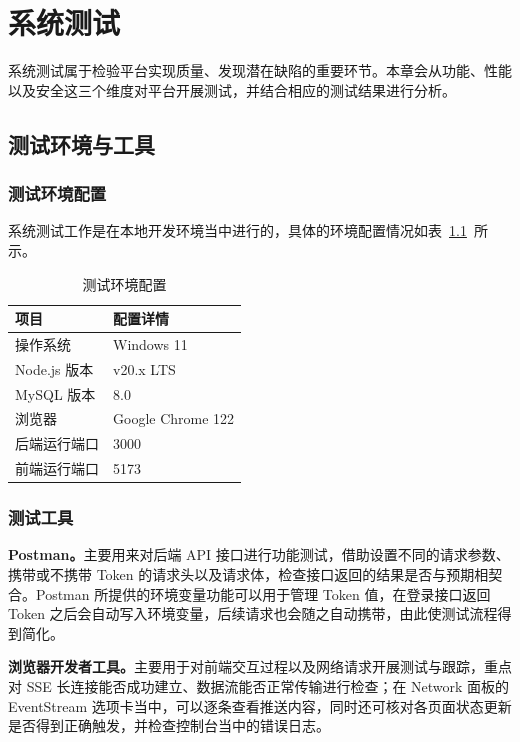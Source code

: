 \chapter{系统测试}

系统测试属于检验平台实现质量、发现潜在缺陷的重要环节。本章会从功能、性能以及安全这三个维度对平台开展测试，并结合相应的测试结果进行分析。

\section{测试环境与工具}

\subsection{测试环境配置}

系统测试工作是在本地开发环境当中进行的，具体的环境配置情况如表~\ref{tab:5-1}~所示。

\begin{table}[H]
    \centering
    \caption{测试环境配置}
    \label{tab:5-1}
    \begin{tabularx}{\linewidth}{lX}
        \toprule
        项目 & 配置详情 \\
        \midrule
        操作系统 & Windows 11 \\
        Node.js 版本 & v20.x LTS \\
        MySQL 版本 & 8.0 \\
        浏览器 & Google Chrome 122 \\
        后端运行端口 & 3000 \\
        前端运行端口 & 5173 \\
        \bottomrule
    \end{tabularx}
\end{table}

\subsection{测试工具}

\textbf{Postman。}主要用来对后端 API 接口进行功能测试，借助设置不同的请求参数、携带或不携带 Token 的请求头以及请求体，检查接口返回的结果是否与预期相契合。Postman 所提供的环境变量功能可以用于管理 Token 值，在登录接口返回 Token 之后会自动写入环境变量，后续请求也会随之自动携带，由此使测试流程得到简化。

\textbf{浏览器开发者工具。}主要用于对前端交互过程以及网络请求开展测试与跟踪，重点对 SSE 长连接能否成功建立、数据流能否正常传输进行检查；在 Network 面板的 EventStream 选项卡当中，可以逐条查看推送内容，同时还可核对各页面状态更新是否得到正确触发，并检查控制台当中的错误日志。


